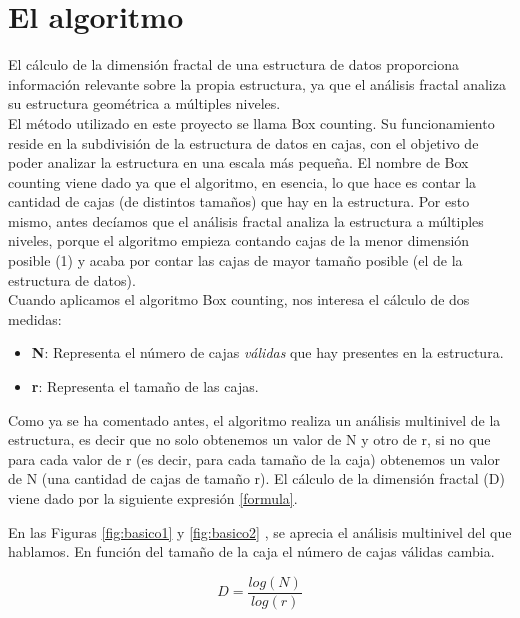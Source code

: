 \chapter{El algoritmo}

El cálculo de la dimensión fractal de una estructura de datos proporciona información relevante sobre la propia estructura, ya que el análisis fractal analiza su estructura geométrica a múltiples niveles.\\

El método utilizado en este proyecto se llama Box counting. Su funcionamiento reside en la subdivisión de la estructura de datos en cajas, con el objetivo de poder analizar la estructura en una escala más pequeña. El nombre de Box counting viene dado ya que el algoritmo, en esencia, lo que hace es contar la cantidad de cajas (de distintos tamaños) que hay en la estructura. Por esto mismo, antes decíamos que el análisis fractal analiza la estructura a múltiples niveles, porque el algoritmo empieza contando cajas de la menor dimensión posible (1) y acaba por contar las cajas de mayor tamaño posible (el de la estructura de datos).\\

Cuando aplicamos el algoritmo Box counting, nos interesa el cálculo de dos medidas:


\begin{itemize}
    \item \textbf{N}: Representa el número de cajas \textit{válidas} que hay presentes en la estructura.
    \item \textbf{r}: Representa el tamaño de las cajas. 
\end{itemize}
 
Como ya se ha comentado antes, el algoritmo realiza un análisis multinivel de la estructura, es decir que no solo obtenemos un valor de N y otro de r, si no que para cada valor de r (es decir, para cada tamaño de la caja) obtenemos un valor de N (una cantidad de cajas de tamaño r). El cálculo de la dimensión fractal (D) viene dado por la siguiente expresión \ref{formula}.

En las Figuras \ref{fig:basico1} y \ref{fig:basico2} , se aprecia el análisis multinivel del que hablamos. En función del tamaño de la caja el número de cajas válidas cambia.

\begin{equation}
    \label{formula}
    D = \frac{log(N)}{log(r)}
\end{equation}

